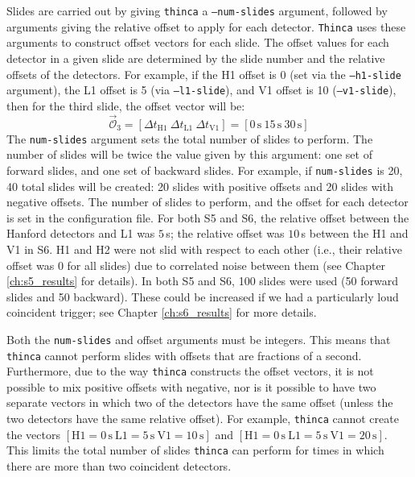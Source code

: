 Slides are carried out by giving \texttt{thinca} a \texttt{--num-slides}
argument, followed by arguments giving the relative offset to apply for each
detector. \texttt{Thinca} uses these arguments to construct offset vectors for
each slide. The offset values for each detector in a given slide are determined
by the slide number and the relative offsets of the detectors. For example, if
the H1 offset is 0 (set via the \texttt{--h1-slide} argument), the L1 offset is
5 (via \texttt{--l1-slide}), and V1 offset is 10 (\texttt{--v1-slide}), then
for the third slide, the offset vector will be:
\begin{equation}
\label{eqn:example_offsetvec}
\vec{\mathcal{O}}_3 = [\Delta t_{\mathrm{H1}} ~ \Delta t_{\mathrm{L1}} ~ \Delta t_{\mathrm{V1}}] = [0\,\mathrm{s} ~ 15\,\mathrm{s} ~ 30\,\mathrm{s}] 
\end{equation}
The \texttt{num-slides} argument sets the total number of slides to perform.
The number of slides will be twice the value given by this argument: one set of
forward slides, and one set of backward slides. For example, if
\texttt{num-slides} is 20, 40 total slides will be created: 20 slides with
positive offsets and 20 slides with negative offsets. The number of slides to
perform, and the offset for each detector is set in the configuration file. For
both \ac{S5} and \ac{S6}, the relative offset between the Hanford detectors and
L1 was $5\,$s; the relative offset was $10\,$s between the H1 and V1 in
\ac{S6}. H1 and H2 were not slid with respect to each other (i.e., their
relative offset was 0 for all slides) due to correlated noise between them (see
Chapter \ref{ch:s5_results} for details). In both \ac{S5} and \ac{S6}, 100
slides were used (50 forward slides and 50 backward). These could be increased
if we had a particularly loud coincident trigger; see Chapter
\ref{ch:s6_results} for more details. 

Both the \texttt{num-slides} and offset arguments must be integers. This means
that \texttt{thinca} cannot perform slides with offsets that are fractions of a
second. Furthermore, due to the way \texttt{thinca} constructs the offset
vectors, it is not possible to mix positive offsets with negative, nor is it
possible to have two separate vectors in which two of the detectors have the
same offset (unless the two detectors have the same relative offset). For
example, \texttt{thinca} cannot create the vectors $[\mathrm{H1} =
0\,\mathrm{s} ~ \mathrm{L1} = 5\,\mathrm{s} ~ \mathrm{V1} = 10\,\mathrm{s}]$
and $[\mathrm{H1} = 0\,\mathrm{s} ~ \mathrm{L1} = 5\,\mathrm{s} ~ \mathrm{V1} =
20\,\mathrm{s}]$. This limits the total number of slides \texttt{thinca} can
perform for times in which there are more than two coincident detectors.


